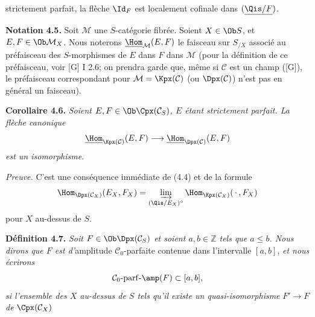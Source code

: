 strictement parfait, la flèche \(\Id_F\) est localement cofinale dans \((\underline{\Qis/F})\).

\textbf{Notation 4.5.} Soit \(\mathcal M\) une \(S\)-catégorie fibrée. Soient \(X\in\Ob S\), et \(E,F\in\Ob\mathcal M_X\). Nous noterons \(\underline{\Hom}_{\mathcal M}(E,F)\) le faisceau sur \(S_{/X}\) associé au préfaisceau des \(S\)-morphismes de \(E\) dans \(F\) dans \(\mathcal M\) (pour la définition de ce préfaisceau, voir [G] I 2.6; on prendra garde que, même si \(\mathcal C\) est un champ ([G]), le préfaisceau correspondant pour \(\mathcal M=\Kpx(\mathcal C)\) (ou \(\Dpx(\mathcal C)\)) n'est pas en général un faisceau).

\textbf{Corollaire 4.6.} \emph{Soient \(E,F\in\Ob\Cpx(\mathcal C_S)\), \(E\) étant strictement parfait. La flèche canonique}
\[
  \underline{\Hom}_{\Kpx(\mathcal C)}(E,F)
  \longrightarrow
  \underline{\Hom}_{\Dpx(\mathcal C)}(E,F)
\]
\emph{est un isomorphisme}.

\emph{Preuve.} C'est une conséquence immédiate de (4.4) et de la formule
\[
  \Hom_{\Dpx(\mathcal C_X)}(E_X,F_X)
  = \varinjlim_{(\Qis/E_X)^\circ}\Hom_{\Kpx(\mathcal C_X)}(\,\cdot\,,F_X)
\]
pour \(X\) au-dessus de \(S\).

\textbf{Définition 4.7.} \emph{Soit \(F\in\Ob\Dpx(\mathcal C_S)\) et soient \(a,b\in\mathbb Z\) tels que \(a\leq b\). Nous dirons que \(F\) est d'}amplitude \(\mathcal C_0\)-parfaite contenue dans l'intervalle \([a,b]\), \emph{et nous écrirons}
\[
  \mathcal C_0\text{-}\mathrm{parf}\text{-}\amp(F)\subset[a,b],
\]
\emph{si l'ensemble des \(X\) au-dessus de \(S\) tels qu'il existe un quasi-isomorphisme} \(F'\to F\) \emph{de} \(\Cpx(\mathcal C_X)\)
